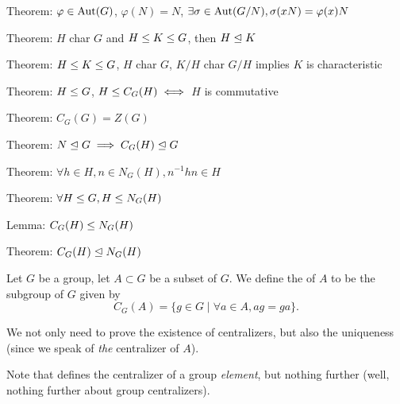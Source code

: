 \LA{}Theorem: $\varphi\in\operatorname{Aut}(G)$, $\varphi(N)=N$, $\exists\sigma\in\operatorname{Aut}(G/N),\sigma(xN)=\varphi(x)N$~{\nwtagstyle{}}\RA{}

\LA{}Theorem: $H$ char $G$ and $H\leq K\leq G$, then $H\trianglelefteq K$~{\nwtagstyle{}}\RA{}

\LA{}Theorem: $H\leq K\leq G$, $H$ char $G$, $K/H$ char $G/H$ implies $K$ is characteristic~{\nwtagstyle{}}\RA{}

\LA{}Theorem: $H\leq G$, $H\leq C_{G}(H)\iff$ $H$ is commutative~{\nwtagstyle{}}\RA{}

\LA{}Theorem: $C_{G}(G)=Z(G)$~{\nwtagstyle{}}\RA{}

\LA{}Theorem: $N\trianglelefteq G\implies C_{G}(H)\trianglelefteq G$~{\nwtagstyle{}}\RA{}

\LA{}Theorem: $\forall h\in H,n\in N_{G}(H), n^{-1}hn\in H$~{\nwtagstyle{}}\RA{}

\LA{}Theorem: $\forall H\leq G, H\leq N_{G}(H)$~{\nwtagstyle{}}\RA{}

\LA{}Lemma: $C_{G}(H)\leq N_{G}(H)$~{\nwtagstyle{}}\RA{}

\LA{}Theorem: $C_{G}(H)\trianglelefteq N_{G}(H)$~{\nwtagstyle{}}\RA{}
\nwendcode{}\nwdocspar

\begin{definition}\label{defn:characteristic-subgroup:centralizer-of-subset}
  Let $G$ be a group, let $A\subset G$ be a subset of $G$.
  We define the  of $A$ to be the subgroup of $G$
  given by
  \begin{equation}
C_{G}(A) = \{g\in G\mid \forall a\in A, ag=ga\}.
  \end{equation}
\end{definition}

\begin{def-remark}
We not only need to prove the existence of centralizers, but also the
uniqueness (since we speak of \emph{the} centralizer of $A$).
\end{def-remark}
\begin{def-remark}
Note that  defines the centralizer of a group \emph{element},
but nothing further (well, nothing further about group centralizers).
\end{def-remark}


